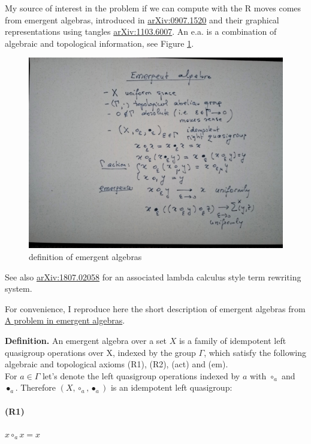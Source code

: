 \documentclass[]{article}
\let\oldparagraph\paragraph
\renewcommand{\paragraph}[1]{\oldparagraph{#1}\mbox{}}
\begin{document}
My source of interest in the problem if we can compute with the R moves
comes from emergent algebras, introduced in \cite{buligairq} 
\href{http://arxiv.org/abs/0907.1520}{arXiv:0907.1520} and their
graphical representations using tangles \cite{buligatangle}
\href{http://arxiv.org/abs/1103.6007}{arXiv:1103.6007}. An e.a. is a
combination of algebraic and topological information, see Figure \ref{definition-of-emergent-algebras}.

\begin{figure}[h!]
\centering
\includegraphics[width=0.75\linewidth]{img/2626.jpg}
\caption{definition of emergent algebras}
\label{definition-of-emergent-algebras}
\end{figure}

See also  \cite{buligaem} 
\href{https://arxiv.org/abs/1807.02058}{arXiv:1807.02058} for an
associated lambda calculus style term rewriting system.

For convenience, I reproduce here the short description of emergent algebras from \cite{buligacolin} \href{https://mbuliga.github.io/colin/colin.pdf}{A problem in
emergent algebras}. 

{\bf Definition.} An emergent algebra over a set $X$ is a family of idempotent left quasigroup operations over X, 
indexed by the group $\Gamma$, which satisfy the following algebraic and topological axioms (R1), (R2), (act) and (em). \\


For $a \in \Gamma$ let's denote the left quasigroup operations indexed by $a$ with $\circ_a$ and $\bullet_a$. Therefore 
$(X,\circ_a ,\bullet_a )$ is an idempotent left quasigroup: \\

\paragraph{(R1)} $x \circ_a x = x$ 
 
\end{document}
